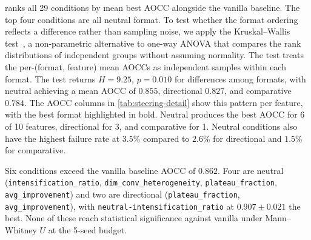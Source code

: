  ranks all 29 conditions by mean best AOCC alongside the vanilla baseline. The top four conditions are all neutral format. To test whether the format ordering reflects a difference rather than sampling noise, we apply the Kruskal--Wallis test~\cite{kruskal1952ranks}, a non-parametric alternative to one-way ANOVA that compares the rank distributions of independent groups without assuming normality. The test treats the per-(format, feature) mean AOCCs as independent samples within each format. The test returns $H = 9.25$, $p = 0.010$ for differences among formats, with neutral achieving a mean AOCC of $0.855$, directional $0.827$, and comparative $0.784$. The AOCC columns in \cref{tab:steering-detail} show this pattern per feature, with the best format highlighted in bold. Neutral produces the best AOCC for 6 of 10 features, directional for 3, and comparative for 1. Neutral conditions also have the highest failure rate at $3.5\%$ compared to $2.6\%$ for directional and $1.5\%$ for comparative.

Six conditions exceed the vanilla baseline AOCC of $0.862$. Four are neutral (\texttt{intensification\_ratio}, \texttt{dim\_conv\_heterogeneity}, \texttt{plateau\_fraction}, \texttt{avg\_improvement}) and two are directional (\texttt{plateau\_fraction}, \texttt{avg\_improvement}), with \texttt{neutral-intensification\_ratio} at $0.907 \pm 0.021$ the best. None of these reach statistical significance against vanilla under Mann--Whitney $U$ at the 5-seed budget.

